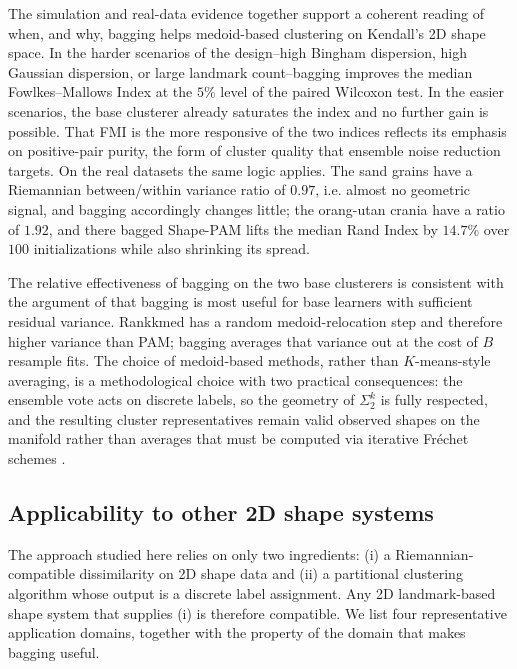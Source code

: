 \documentclass[review,11pt,3p,authoryear]{elsarticle}
\begin{document}
The simulation and real-data evidence together support a coherent
reading of when, and why, bagging helps medoid-based clustering on
Kendall's 2D shape space. In the harder scenarios of the design--high
Bingham dispersion, high Gaussian dispersion, or large landmark
count--bagging improves the median Fowlkes--Mallows Index at the
$5\%$ level of the paired Wilcoxon test. In the easier scenarios, the
base clusterer already saturates the index and no further gain is
possible. That FMI is the more responsive of the two indices reflects
its emphasis on positive-pair purity, the form of cluster quality
that ensemble noise reduction targets. On the real datasets the same logic applies. The sand grains have a
Riemannian between/within variance ratio of $0.97$, i.e. almost no
geometric signal, and bagging accordingly changes little; the orang-utan
crania have a ratio of $1.92$, and there bagged Shape-PAM lifts the
median Rand Index by $14.7\%$ over $100$ initializations while also
shrinking its spread.

The relative effectiveness of bagging on the two base clusterers is
consistent with the argument of \citet{breiman1996bagging} that
bagging is most useful for base learners with sufficient residual
variance. Rankkmed has a random medoid-relocation step and therefore
higher variance than PAM; bagging averages that variance out at the
cost of $B$ resample fits. The choice of medoid-based methods, rather
than $K$-means-style averaging, is a methodological choice with two
practical consequences: the ensemble vote acts on discrete labels, so
the geometry of $\Sigma_2^k$ is fully respected, and the resulting
cluster representatives remain valid observed shapes on the manifold
rather than averages that must be computed via iterative Fr\'{e}chet
schemes \citep{eltzner2021stability}.

\subsection{Applicability to other 2D shape systems}
\label{subsec:applicability}

The approach studied here relies on only two ingredients: (i) a
Riemannian-compatible dissimilarity on 2D shape data and (ii) a
partitional clustering algorithm whose output is a discrete label
assignment. Any 2D landmark-based shape system that supplies (i) is
therefore compatible. We list four representative application
domains, together with the property of the domain that makes bagging
useful.
\end{document}
